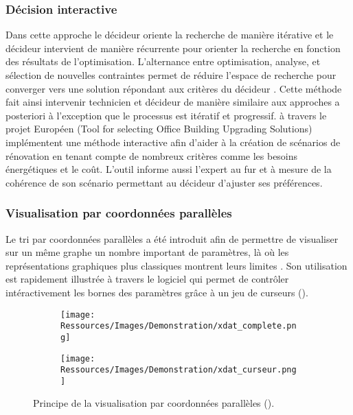 \subsubsection{Décision interactive} %
\label{ssub:decision_interactive}
Dans cette approche le décideur oriente la recherche de manière itérative et le décideur
intervient de manière récurrente pour orienter la recherche en fonction des résultats de
l’optimisation. L’alternance entre optimisation, analyse, et sélection de nouvelles
contraintes permet de réduire l’espace de recherche pour converger vers une solution
répondant aux critères du décideur \parencite{Hwang1979}. Cette méthode fait ainsi
intervenir technicien et décideur de manière similaire aux approches a posteriori à
l’exception que le processus est itératif et progressif.
\textcite{Flourentzou2002185} à travers le projet Européen  (Tool for selecting Office Building
Upgrading Solutions) implémentent une méthode interactive afin d’aider
à la création de scénarios de rénovation en tenant compte de nombreux critères comme les
besoins énergétiques et le coût. L’outil informe aussi l’expert au fur et à mesure de la
cohérence de son scénario permettant au décideur d’ajuster ses préférences.


\subsubsection{Visualisation par coordonnées parallèles} %
\label{ssub:visualisation_par_coordonnees_paralleles}
Le tri par coordonnées parallèles a été introduit afin de permettre de visualiser
sur un même graphe un nombre important de paramètres, là où les représentations
graphiques plus classiques montrent leurs limites \parencite{Inselberg198725}.
Son utilisation est rapidement illustrée à travers le logiciel 
qui permet de contrôler intéractivement les bornes des paramètres grâce à un jeu de
curseurs ().

\begin{figure}
    \centering
    \begin{subfigure}[b]{0.48\textwidth}
        \centering
        \texttt{[image: Ressources/Images/Demonstration/xdat\_complete.png]}
        \caption{}
        \label{fig:xdat_complete}
    \end{subfigure}
    \quad
    \begin{subfigure}[b]{0.48\textwidth}
        \centering
        \texttt{[image: Ressources/Images/Demonstration/xdat\_curseur.png]}
        \caption{}
        \label{fig:xdat_curseur}
    \end{subfigure}
    \caption[Principe de la visualisation par coordonnées parallèles]
            {Principe de la visualisation par coordonnées parallèles
             ().}
    \label{fig:principe_xdat}
\end{figure}

